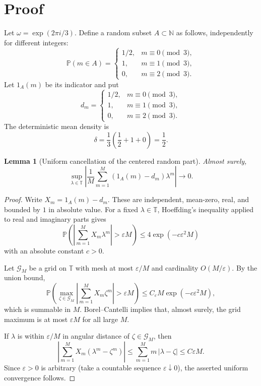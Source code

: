 \documentclass[11pt]{article}
\newtheorem{lemma}{Lemma}
\newcommand{\T}{\mathbb T}
\newcommand{\N}{\mathbb N}
\newcommand{\Prob}{\mathbb P}
\newcommand{\eps}{\varepsilon}
\begin{document}
\section*{Proof}

Let $\omega=\exp(2\pi i/3)$.  Define a random subset $A\subset\N$ as follows, independently for different integers:
\[
  \Prob(m\in A)=
  \begin{cases}
    1/2, & m\equiv 0 \pmod 3,\\
    1, & m\equiv 1 \pmod 3,\\
    0, & m\equiv 2 \pmod 3.
  \end{cases}
\]
Let $1_A(m)$ be its indicator and put
\[
  d_m =
  \begin{cases}
    1/2, & m\equiv 0 \pmod 3,\\
    1, & m\equiv 1 \pmod 3,\\
    0, & m\equiv 2 \pmod 3.
  \end{cases}
\]
The deterministic mean density is
\[
        \delta=\frac{1}{3}\left(\frac12+1+0\right)=\frac12.
\]

\begin{lemma}[Uniform cancellation of the centered random part]
Almost surely,
\[
  \sup_{\lambda\in\T}
  \left|
    \frac1M\sum_{m=1}^M (1_A(m)-d_m)\lambda^m
  \right|\longrightarrow 0 .
\]
\end{lemma}

\begin{proof}
Write $X_m=1_A(m)-d_m$.  These are independent, mean-zero, real, and bounded by $1$ in absolute value.  For a fixed $\lambda\in\T$, Hoeffding's inequality applied to real and imaginary parts gives
\[
  \Prob\left(\left|\sum_{m=1}^M X_m\lambda^m\right|>\eps M\right)
  \leq 4\exp(-c\eps^2 M)
\]
with an absolute constant $c>0$.

Let $\mathcal G_M$ be a grid on $\T$ with mesh at most $\eps/M$ and cardinality $O(M/\eps)$.  By the union bound,
\[
  \Prob\left(\max_{\zeta\in\mathcal G_M}
  \left|\sum_{m=1}^M X_m\zeta^m\right|>\eps M\right)
  \leq C_\eps M \exp(-c\eps^2 M),
\]
which is summable in $M$.  Borel--Cantelli implies that, almost surely, the grid maximum is at most $\eps M$ for all large $M$.

If $\lambda$ is within $\eps/M$ in angular distance of $\zeta\in\mathcal G_M$, then
\[
  \left|\sum_{m=1}^M X_m(\lambda^m-\zeta^m)\right|
  \leq \sum_{m=1}^M m\,|\lambda-\zeta|
  \leq C\eps M.
\]
Since $\eps>0$ is arbitrary (take a countable sequence $\eps\downarrow0$), the asserted uniform convergence follows.
\end{proof}
\end{document}
